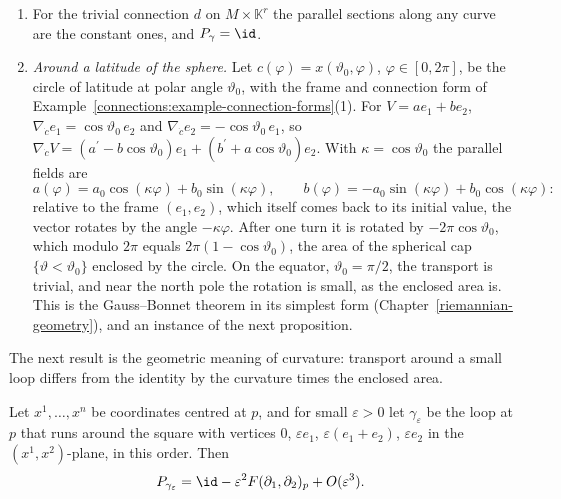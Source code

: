 \begin{example}\label{connections:example-transport}
\begin{enumerate}
\item For the trivial connection $d$ on $M \times \mathbb{K}^r$ the parallel sections along any curve are the constant ones, and $P_\gamma = \id$.
\item \emph{Around a latitude of the sphere.} Let $c(\varphi) = x(\vartheta_0, \varphi)$, $\varphi \in [0, 2\pi]$, be the circle of latitude at polar angle $\vartheta_0$, with the frame
and connection form of Example~\ref{connections:example-connection-forms}(1). For $V = ae_1 + be_2$, $\nabla_{\dot c}e_1 = \cos\vartheta_0\,e_2$ and
$\nabla_{\dot c}e_2 = -\cos\vartheta_0\,e_1$, so $\nabla_{\dot c}V = (a^{\prime} - b\cos\vartheta_0)e_1 + (b^{\prime} + a\cos\vartheta_0)e_2$. With $\kappa = \cos\vartheta_0$ the parallel
fields are
\[
a(\varphi) = a_0\cos(\kappa\varphi) + b_0\sin(\kappa\varphi), \qquad b(\varphi) = -a_0\sin(\kappa\varphi) + b_0\cos(\kappa\varphi):
\]
relative to the frame $(e_1, e_2)$, which itself comes back to its initial value, the vector rotates by the angle $-\kappa\varphi$. After one turn it is rotated by
$-2\pi\cos\vartheta_0$, which modulo $2\pi$ equals $2\pi(1 - \cos\vartheta_0)$, the area of the spherical cap $\{\vartheta < \vartheta_0\}$ enclosed by the circle. On the equator,
$\vartheta_0 = \pi/2$, the transport is trivial, and near the north pole the rotation is small, as the enclosed area is. This is the Gauss--Bonnet theorem in its simplest form
(Chapter~\ref{riemannian-geometry}), and an instance of the next proposition.
\end{enumerate}
\end{example}

The next result is the geometric meaning of curvature: transport around a small loop differs from the identity by the curvature times the enclosed area.

\begin{proposition}\label{connections:proposition-small-loops}
Let $x^1, \ldots, x^n$ be coordinates centred at $p$, and for small $\varepsilon > 0$ let $\gamma_\varepsilon$ be the loop at $p$ that runs around the square with vertices $0$,
$\varepsilon e_1$, $\varepsilon(e_1 + e_2)$, $\varepsilon e_2$ in the $(x^1, x^2)$-plane, in this order. Then
\[
P_{\gamma_\varepsilon} = \id - \varepsilon^2F(\partial_1, \partial_2)_p + O(\varepsilon^3).
\]
\end{proposition}

